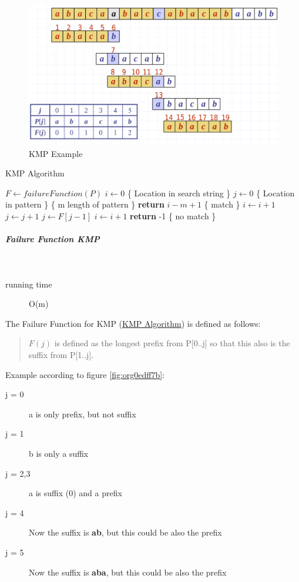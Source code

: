 \documentclass[11pt,twoside,twocolumn,landscape]{article}
\begin{document}
\begin{figure}[htbp]
\centering
\includegraphics[width=.9\linewidth]{img/kmp_example.png}
\caption{\label{fig:org00980dd}KMP Example}
\end{figure}


\begin{algorithm}
  \caption{KMP Algorithm}
  \begin{algorithmic}[1]
    \State $F \leftarrow failureFunction(P)$
    \State $i \leftarrow 0$ \{ Location in search string \}
    \State $j \leftarrow 0$ \{ Location in pattern \}
     \{ m length of pattern \}
    \State \textbf{return} $i - m + 1$ \{ match \}
    \Else
    \State $i \leftarrow i + 1$
    \State $j \leftarrow j + 1$
    \EndIf
    \Else
    \State $j \leftarrow F[j-1]$
    \Else
    \State $i \leftarrow i + 1$
    \EndIf
    \EndIf
    \EndWhile
    \textbf{return} -1 \{ no match \}
    \EndProcedure
  \end{algorithmic}
\end{algorithm}

\subparagraph{Failure Function KMP} \
\label{sec:org3c98e56}

\begin{description}
\item[{running time}] O(m)
\end{description}


The Failure Function for KMP (\href{../../../roam/20211215172001-kmp_algorithm.org}{KMP Algorithm}) is defined as follows:
\begin{quote}
\(F(j)\) is defined as the longest prefix from P[0..j] so that this also is the suffix from P[1..j].
\end{quote}

Example according to figure \ref{fig:org0edff7b}:
\begin{description}
\item[{j = 0}] a is only prefix, but not suffix
\item[{j = 1}] b is only a suffix
\item[{j = 2,3}] a is suffix (0) and a prefix
\item[{j = 4}] Now the suffix is \textbf{ab}, but this could be also the prefix
\item[{j = 5}] Now the suffix is \textbf{aba}, but this could be also the prefix
\end{description}
\end{document}
